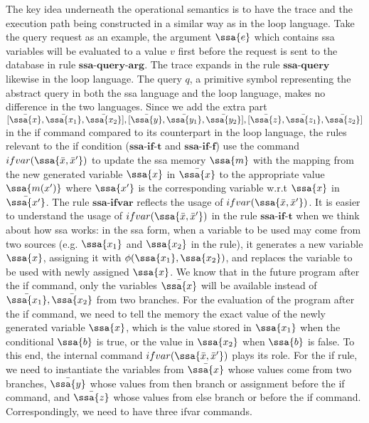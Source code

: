 The key idea underneath the operational semantics is to have the trace and the execution path being constructed in a similar way as in the loop language. Take the query request as an example, the argument $\ssa{e}$ which contains ssa variables will be evaluated to a value $v$ first before the request is sent to the database in rule $\textbf{ssa-query-arg}$. The trace expands in the rule $\textbf{ssa-query}$ likewise in the loop language. The query $q$, a primitive symbol representing the abstract query in both the ssa language and  the loop language, makes no difference in the two languages. Since we add the extra part $[\bar{\ssa{x}}, \bar{\ssa{x_1}}, \bar{\ssa{x_2}}] ,[\bar{\ssa{y}}, \bar{\ssa{y_1}}, \bar{\ssa{y_2}}] ,[\bar{\ssa{z}},\bar{\ssa{z_1}}, \bar{\ssa{z_2}}]  $ in the if command compared to its counterpart in the loop language, the rules relevant to the if condition ($\textbf{ssa-if-t}$ and $\textbf{ssa-if-f}$) use the command $ifvar(\ssa{\bar{x}, \bar{x}'})$ to update the ssa memory $\ssa{m}$ with the mapping from the new generated variable $\ssa{x}$ in $\bar{\ssa{x}}$ to the appropriate value $\ssa{m(x')}$ where $\ssa{x'}$ is the corresponding variable w.r.t $\ssa{x}$ in $\bar{\ssa{x'}}$. The rule $\textbf{ssa-ifvar}$ reflects the usage of $ifvar(\ssa{\bar{x}, \bar{x}'})$. It is easier to understand the usage of $ifvar(\ssa{\bar{x}, \bar{x}'})$ in the rule $\textbf{ssa-if-t}$ when we think about how ssa works: in the ssa form, when a variable to be used may come from two sources (e.g. $\ssa{x_1}$ and $\ssa{x_2}$ in the rule), it generates a new variable $\ssa{x}$, assigning it with $\phi(\ssa{x_1}, \ssa{x_2})$,  and replaces the variable to be used with newly assigned $\ssa{x}$. We know that in the future program after the if command, only the variables $\bar{\ssa{x}}$ will be available instead of   $\bar{\ssa{x_1}}, \bar{\ssa{x_2}}$ from two branches. For the evaluation of the program after the if command, we need to tell the memory the exact value of the newly generated variable $\ssa{x}$, which is the value stored in $\ssa{x_1}$ when the conditional $\ssa{b}$ is true, or the value in $\ssa{x_2}$ when $\ssa{b}$ is false. To this end, the internal command $ifvar(\ssa{\bar{x}, \bar{x}'})$ plays its role. For the if rule, we need to instantiate the variables from $\bar{\ssa{x}}$ whose values come from two branches, $\bar{\ssa{y}}$ whose values from then branch or assignment before the if command, and $\bar{\ssa{z}}$ whose values from else branch or before the if command. Correspondingly, we need to have three ifvar commands.   

